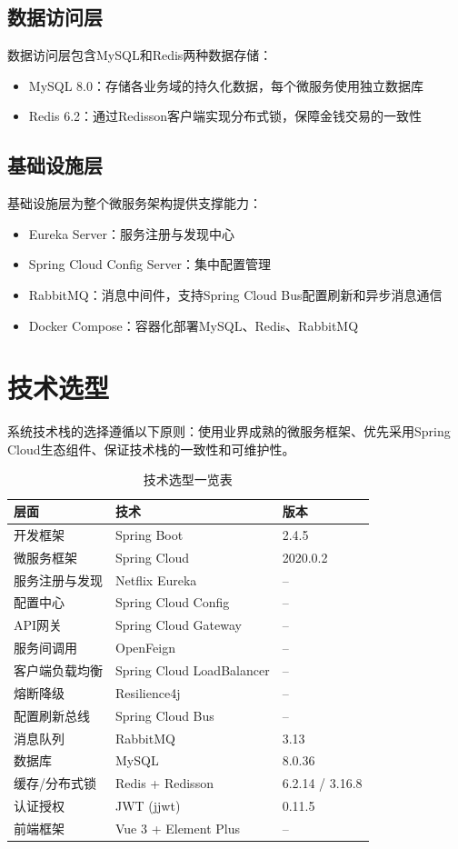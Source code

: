 \subsection{数据访问层}

数据访问层包含MySQL和Redis两种数据存储：
\begin{itemize}
	\item MySQL 8.0：存储各业务域的持久化数据，每个微服务使用独立数据库
	\item Redis 6.2：通过Redisson客户端实现分布式锁，保障金钱交易的一致性
\end{itemize}

\subsection{基础设施层}

基础设施层为整个微服务架构提供支撑能力：
\begin{itemize}
	\item Eureka Server：服务注册与发现中心
	\item Spring Cloud Config Server：集中配置管理
	\item RabbitMQ：消息中间件，支持Spring Cloud Bus配置刷新和异步消息通信
	\item Docker Compose：容器化部署MySQL、Redis、RabbitMQ
\end{itemize}

\section{技术选型}

系统技术栈的选择遵循以下原则：使用业界成熟的微服务框架、优先采用Spring Cloud生态组件、保证技术栈的一致性和可维护性。

\begin{table}[H]
	\centering
	\caption{技术选型一览表}
	\begin{tabular}{p{4.0cm}p{5.0cm}p{5.0cm}}
		\hline
		\textbf{层面} & \textbf{技术} & \textbf{版本} \\
		\hline
		开发框架 & Spring Boot & 2.4.5 \\
		微服务框架 & Spring Cloud & 2020.0.2 \\
		服务注册与发现 & Netflix Eureka & -- \\
		配置中心 & Spring Cloud Config & -- \\
		API网关 & Spring Cloud Gateway & -- \\
		服务间调用 & OpenFeign & -- \\
		客户端负载均衡 & Spring Cloud LoadBalancer & -- \\
		熔断降级 & Resilience4j & -- \\
		配置刷新总线 & Spring Cloud Bus & -- \\
		消息队列 & RabbitMQ & 3.13 \\
		数据库 & MySQL & 8.0.36 \\
		缓存/分布式锁 & Redis + Redisson & 6.2.14 / 3.16.8 \\
		认证授权 & JWT (jjwt) & 0.11.5 \\
		前端框架 & Vue 3 + Element Plus & -- \\
		\hline
	\end{tabular}
\end{table}

